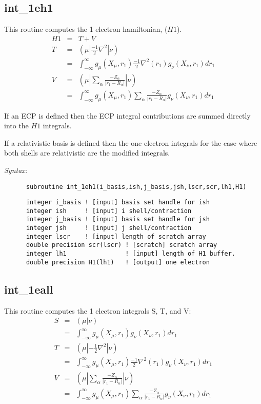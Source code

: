 \subsection{int\_1eh1} 
This routine computes the 1 electron hamiltonian, ($H1$). 
\begin{eqnarray*} 
H1 & = & T + V      \\ 
T  & = & ({\mu}|\frac{-1}{2}\nabla^{2}|{\nu}) \\ 
   & = & \int_{-\infty}^{\infty} g_{\mu}(X_{\mu},r_{1})\frac{-1}{2} 
\nabla^{2}(r_{1})g_{\nu}(X_{\nu},r_{1})dr_{1} \\ 
V  & = & ({\mu}|\sum_{\alpha}\frac{-Z_{\alpha}}{|r_{1}-R_{\alpha}|}|{\nu}) \\ 
   & = & \int_{-\infty}^{\infty} g_{\mu}(X_{\mu},r_{1})\sum_{\alpha}\frac 
{-Z_{\alpha}}{|r_{1}-R_{\alpha}|}g_{\nu}(X_{\nu},r_{1})dr_{1} 
\end{eqnarray*} 
 
If an ECP is defined then the ECP integral contributions are summed 
directly into the $H1$ integrals. 
 
If a relativistic basis is defined then the one-electron integrals for 
the case where both shells are relativistic are the modified integrals. 
 
{\it Syntax:} 
\begin{verbatim} 
      subroutine int_1eh1(i_basis,ish,j_basis,jsh,lscr,scr,lh1,H1) 
\end{verbatim} 
\begin{verbatim} 
      integer i_basis ! [input] basis set handle for ish 
      integer ish     ! [input] i shell/contraction 
      integer j_basis ! [input] basis set handle for jsh 
      integer jsh     ! [input] j shell/contraction 
      integer lscr    ! [input] length of scratch array 
      double precision scr(lscr) ! [scratch] scratch array 
      integer lh1                ! [input] length of H1 buffer. 
      double precision H1(lh1)   ! [output] one electron 
\end{verbatim} 
 
\subsection{int\_1eall} 
This routine computes the 1 electron integrals S, T, and V: 
\begin{eqnarray*} 
S & = & ({\mu}|{\nu}) \\ 
  & = & \int_{{-}\infty}^{\infty}g_{\mu}(X_{\mu},r_{1})g_{\nu}(X_{\nu},r_{1})dr_{1} \\ 
T & = & ({\mu}|-\frac{1}{2}{\nabla^{2}}|{\nu}) \\ 
  & = & \int_{-\infty}^{\infty}g_{\mu}(X_{\mu},r_{1})\frac{-1}{2}{\nabla^{2}}(r_{1})g_{\nu}(X_{\nu},r_{1})dr_{1} \\ 
V & = & ({\mu}|\sum_{\alpha}\frac{-Z_{\alpha}}{|r_{1}-R_{\alpha}|}|{\nu}) \\ 
  & = & \int_{-\infty}^{\infty}g_{\mu}(X_{\mu},r_{1})\sum_{\alpha}\frac{-Z_{\alpha}} 
{|r_{1}-R_{\alpha}|}g_{\nu}(X_{\nu},r_{1})dr_{1} 
\end{eqnarray*} 
 
